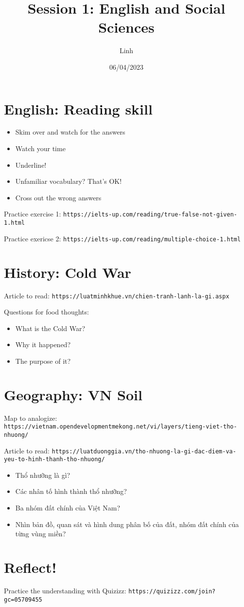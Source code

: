 \documentclass{article}
\title{Session 1: English and Social Sciences}
\author{Linh}
\date{06/04/2023}
\begin{document}
    \maketitle
    \section{English: Reading skill}
    \begin{itemize}
        \item Skim over and watch for the answers
        \item Watch your time
        \item Underline!
        \item Unfamiliar vocabulary? That's OK!
        \item Cross out the wrong answers
    \end{itemize}

    Practice exercise 1: \texttt{https://ielts-up.com/reading/true-false-not-given-1.html}
    
    Practice exericse 2: \texttt{https://ielts-up.com/reading/multiple-choice-1.html}
    \section{History: Cold War}
    Article to read: \texttt{https://luatminhkhue.vn/chien-tranh-lanh-la-gi.aspx}

    Questions for food thoughts:
    \begin{itemize}
        \item What is the Cold War?
        \item Why it happened?
        \item The purpose of it?
    \end{itemize}
    \section{Geography: VN Soil}
    Map to analogize: \texttt{https://vietnam.opendevelopmentmekong.net/vi/layers/tieng-viet-tho-nhuong/}

    Article to read: \texttt{https://luatduonggia.vn/tho-nhuong-la-gi-dac-diem-va-yeu-to-hinh-thanh-tho-nhuong/}
    \begin{itemize}
        \item Thổ nhưỡng là gì?
        \item Các nhân tố hình thành thổ nhưỡng?
        \item Ba nhóm đất chính của Việt Nam?
        \item Nhìn bản đồ, quan sát và hình dung phân bố của đất, nhóm đất chính của từng vùng miền?
    \end{itemize}
    \section{Reflect!}
    Practice the understanding with Quizizz: \texttt{https://quizizz.com/join?gc=05709455}
    
\end{document}
